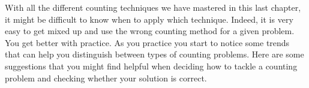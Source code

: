 \documentclass[12pt]{article}
\begin{document}
\begin{activity}
\begin{questions}
\end{questions}
\end{activity}

With all the different counting techniques we have mastered in this last chapter, it might be difficult to know when to apply which technique.  Indeed, it is very easy to get mixed up and use the wrong counting method for a given problem.  You get better with practice.  As you practice you start to notice some trends that can help you distinguish between types of counting problems.  Here are some suggestions that you might find helpful when deciding how to tackle a counting problem and checking whether your solution is correct.
\end{document}
